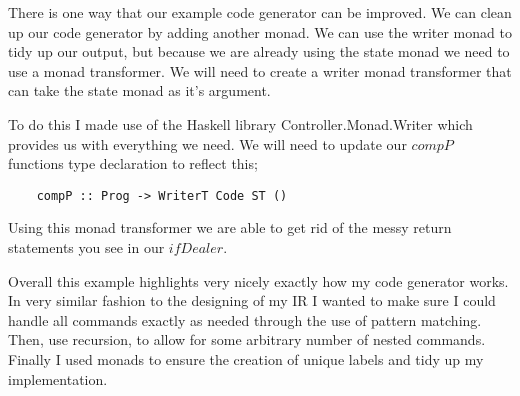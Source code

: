 There is one way that our example code generator can be improved. We can clean up our code generator by adding another monad. We can use the writer monad to tidy up our output, but because we are already using the state monad we need to use a monad transformer. We will need to create a writer monad transformer that can take the state monad as it's argument. 

To do this I made use of the Haskell library Controller.Monad.Writer which provides us with everything we need. We will need to update our $compP$ functions type declaration to reflect this;

\begin{lstlisting}
	compP :: Prog -> WriterT Code ST ()
\end{lstlisting}   

Using this monad transformer we are able to get rid of the messy return statements you see in our $ifDealer$. 

Overall this example highlights very nicely exactly how my code generator works. In very similar fashion to the designing of my IR I wanted to make sure I could handle all commands exactly as needed through the use of pattern matching. Then, use recursion, to allow for some arbitrary number of nested commands. Finally I used monads to ensure the creation of unique labels and tidy up my implementation.
